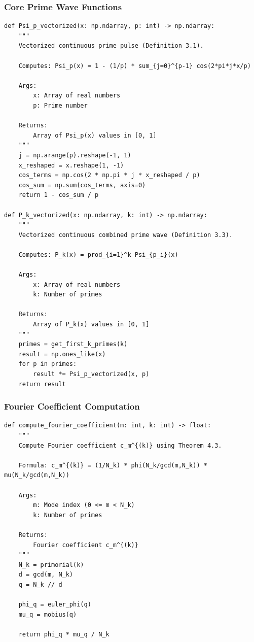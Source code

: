 ﻿\documentclass[12pt,a4paper]{report}
\theoremstyle{plain}
\theoremstyle{definition}
\begin{document}
\subsubsection*{Core Prime Wave Functions}

\begin{verbatim}
def Psi_p_vectorized(x: np.ndarray, p: int) -> np.ndarray:
    """
    Vectorized continuous prime pulse (Definition 3.1).
    
    Computes: Psi_p(x) = 1 - (1/p) * sum_{j=0}^{p-1} cos(2*pi*j*x/p)
    
    Args:
        x: Array of real numbers
        p: Prime number
        
    Returns:
        Array of Psi_p(x) values in [0, 1]
    """
    j = np.arange(p).reshape(-1, 1)
    x_reshaped = x.reshape(1, -1)
    cos_terms = np.cos(2 * np.pi * j * x_reshaped / p)
    cos_sum = np.sum(cos_terms, axis=0)
    return 1 - cos_sum / p

def P_k_vectorized(x: np.ndarray, k: int) -> np.ndarray:
    """
    Vectorized continuous combined prime wave (Definition 3.3).
    
    Computes: P_k(x) = prod_{i=1}^k Psi_{p_i}(x)
    
    Args:
        x: Array of real numbers
        k: Number of primes
        
    Returns:
        Array of P_k(x) values in [0, 1]
    """
    primes = get_first_k_primes(k)
    result = np.ones_like(x)
    for p in primes:
        result *= Psi_p_vectorized(x, p)
    return result
\end{verbatim}

\subsubsection*{Fourier Coefficient Computation}

\begin{verbatim}
def compute_fourier_coefficient(m: int, k: int) -> float:
    """
    Compute Fourier coefficient c_m^{(k)} using Theorem 4.3.
    
    Formula: c_m^{(k)} = (1/N_k) * phi(N_k/gcd(m,N_k)) * mu(N_k/gcd(m,N_k))
    
    Args:
        m: Mode index (0 <= m < N_k)
        k: Number of primes
        
    Returns:
        Fourier coefficient c_m^{(k)}
    """
    N_k = primorial(k)
    d = gcd(m, N_k)
    q = N_k // d
    
    phi_q = euler_phi(q)
    mu_q = mobius(q)
    
    return phi_q * mu_q / N_k
\end{verbatim}
\end{document}
